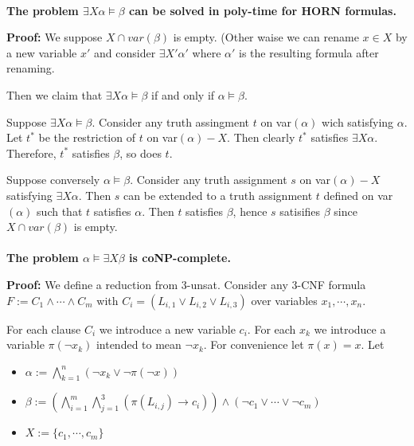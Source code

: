 \documentclass[12pt]{article}
\begin{document}
\ \ \\





{\bf The problem $\exists X \alpha \models \beta$ can be solved in poly-time for HORN formulas.} 

{\bf Proof:} We suppose $X\cap var(\beta)$ is empty. (Other waise we can rename $x\in X$ by a new variable $x'$ and consider $\exists X'\alpha'$ where $\alpha'$ is the resulting formula after renaming.

Then we claim that $\exists X\alpha\models \beta$ if and only if $\alpha\models\beta$. 

Suppose $\exists X\alpha\models \beta$. Consider any truth assingment $t$ on var$(\alpha)$ wich satisfying $\alpha$. Let $t^*$ be the restriction of $t$ on var$(\alpha)-X$. Then clearly $t^*$ satisfies $\exists X\alpha$. Therefore, $t^*$ satisfies $\beta$, so does $t$. 

Suppose conversely $\alpha\models\beta$. Consider any truth assignment $s$ on var$(\alpha)-X$ satisfying $\exists X\alpha$. Then $s$ can be extended to a truth assignment $t$ defined on var$(\alpha)$ such that $t$ satisfies $\alpha$. Then $t$ satisfies $\beta$, hence $s$ satisifies $\beta$ since $X\cap var(\beta)$ is empty.\\ \\


{\bf The problem $\alpha\models\exists X\beta$ is coNP-complete.}

{\bf Proof:} We define a reduction from 3-unsat. Consider any 3-CNF formula $F:=C_1\wedge\cdots\wedge C_m$ with $C_i=(L_{i,1}\vee L_{i,2}\vee L_{i,3})$ over variables $x_1,\cdots, x_n$.

For each clause $C_i$ we introduce a new variable $c_i$. For each $x_k$ we introduce a variable $\pi(\neg x_k)$ intended to mean $\neg x_k$. For convenience let $\pi(x)=x$. Let 

\begin{itemize}
\item $\alpha:=\bigwedge_{k=1}^{n} (\neg x_k\vee \neg \pi(\neg x)) $

\item $\beta:=\left(\bigwedge_{i=1}^{m}\bigwedge_{j=1}^{3}\left(\pi(L_{i,j})\rightarrow c_i\right)\right)\wedge (\neg c_1\vee\cdots\vee\neg c_m)$

\item $X:=\{c_1,\cdots,c_m\}$
\end{itemize}
\end{document}
